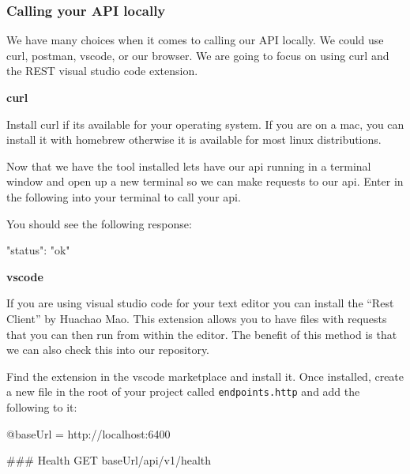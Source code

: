 \documentclass{csse4400}
\begin{document}

\subsubsection{Calling your API locally}

We have many choices when it comes to calling our API locally. We could use curl, postman, vscode, or our browser. We are going to focus on using curl and the REST visual studio code extension.


\textbf{curl}

Install curl if its available for your operating system. If you are on a mac, you can install it with homebrew otherwise it is available for most linux distributions.

Now that we have the tool installed lets have our api running in a terminal window and open up a new terminal so we can make requests to our api. Enter in the following into your terminal to call your api.



You should see the following response:

\begin{code}[language=json,numbers=none]{}
  {
    "status": "ok"
  }
\end{code}

\textbf{vscode}

If you are using visual studio code for your text editor you can install the ``Rest Client'' by Huachao Mao. This extension allows you to have files with requests that you can then run from  within the editor. The benefit of this method is that we can also check this into our repository.

Find the extension in the vscode marketplace and install it. Once installed, create a new file in the root of your project called \texttt{endpoints.http} and add the following to it:

\begin{code}[numbers=none]{}
  @baseUrl = http://localhost:6400

  ### Health
  GET {{baseUrl}}/api/v1/health
\end{code}
\end{document}
